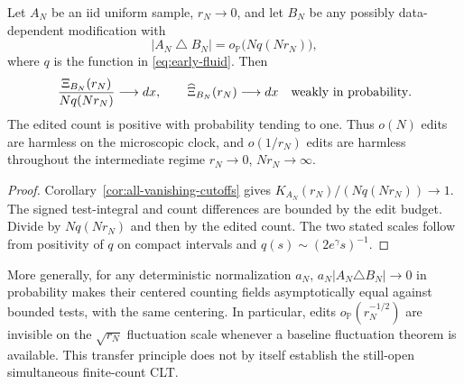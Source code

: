 \documentclass[11pt,letterpaper]{article}
\newcommand{\PP}{\mathbb P}\newcommand{\EE}{\mathbb E}
\begin{document}
\begin{corollary}
\label{cor:edit-robustness}
Let $A_N$ be an iid uniform sample, $r_N\to0$, and let $B_N$ be any
possibly data-dependent modification with
\[
 |A_N\mathbin\triangle B_N|=o_{\PP}\bigl(Nq(Nr_N)\bigr),
\]
where $q$ is the function in \eqref{eq:early-fluid}. Then
\[
 \frac{\Xi_{B_N}(r_N)}{Nq(Nr_N)}\longrightarrow dx,\qquad
 \widehat\Xi_{B_N}(r_N)\longrightarrow dx
 \quad\hbox{weakly in probability}.
\]
The edited count is positive with probability tending to one.
Thus $o(N)$ edits are harmless on the microscopic clock, and
$o(1/r_N)$ edits are harmless throughout the intermediate regime
$r_N\to0$, $Nr_N\to\infty$.
\end{corollary}
\begin{proof}
Corollary~\ref{cor:all-vanishing-cutoffs} gives
$K_{A_N}(r_N)/(Nq(Nr_N))\to1$. The signed test-integral and count
differences are bounded by the edit budget. Divide by $Nq(Nr_N)$
and then by the edited count. The two stated scales follow from
positivity of $q$ on compact intervals and
$q(s)\sim(2e^\gamma s)^{-1}$.
\end{proof}

More generally, for any deterministic normalization $a_N$,
$a_N|A_N\triangle B_N|\to0$ in probability makes their centered
counting fields asymptotically equal against bounded tests, with
the same centering. In particular, edits $o_{\PP}(r_N^{-1/2})$ are
invisible on the $\sqrt{r_N}$ fluctuation scale whenever a baseline
fluctuation theorem is available. This transfer principle does not
by itself establish the still-open simultaneous finite-count CLT.
\end{document}
